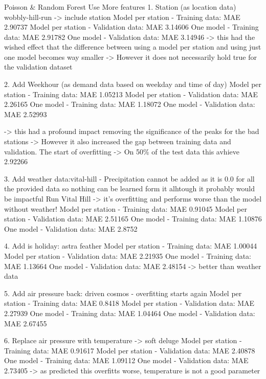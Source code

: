 \documentclass[a4paper]{article}
\begin{document}
    \subsubsection*{}
    Poisson \& Random Forest Use More features
    1. Station (as location data)
    wobbly-hill-run -> include station
    Model per station - Training data: MAE 2.90737
    Model per station - Validation data: MAE 3.14606
    One model - Training data: MAE 2.91782
    One model - Validation data: MAE 3.14946
    -> this had the wished effect that the difference between using a model per station and using just one model
    becomes way smaller
    -> However it does not necessarily hold true for the validation dataset

    2. Add Weekhour (as demand data based on weekday and time of day)
    Model per station - Training data: MAE 1.05213
    Model per station - Validation data: MAE 2.26165
    One model - Training data: MAE 1.18072
    One model - Validation data: MAE 2.52993

    -> this had a profound impact removing the significance of the peaks for the bad stations
    -> However it also increased the gap between training data and validation. The start of overfitting
    -> On 50\% of the test data this avhieve 2.92266

    3. Add weather data:vital-hill
    - Precipitation cannot be added as it is 0.0 for all the provided data so nothing can be learned form it
    alhtough it probably would be impactful
    Run Vital Hill -> it's overfitting and performs worse than the model without weather!
    Model per station - Training data: MAE 0.91045
    Model per station - Validation data: MAE 2.51165
    One model - Training data: MAE 1.10876
    One model - Validation data: MAE 2.8752

    4. Add is holiday: astra feather
    Model per station - Training data: MAE 1.00044
    Model per station - Validation data: MAE 2.21935
    One model - Training data: MAE 1.13664
    One model - Validation data: MAE 2.48154
    -> better than weather data

    5. Add air pressure back: driven cosmos - overfitting starts again
    Model per station - Training data: MAE 0.8418
    Model per station - Validation data: MAE 2.27939
    One model - Training data: MAE 1.04464
    One model - Validation data: MAE 2.67455


    6. Replace air pressure with temperature -> soft deluge
    Model per station - Training data: MAE 0.91617
    Model per station - Validation data: MAE 2.40878
    One model - Training data: MAE 1.09112
    One model - Validation data: MAE 2.73405
    -> as predicted this overfitts worse, temperature is not a good parameter
\end{document}
